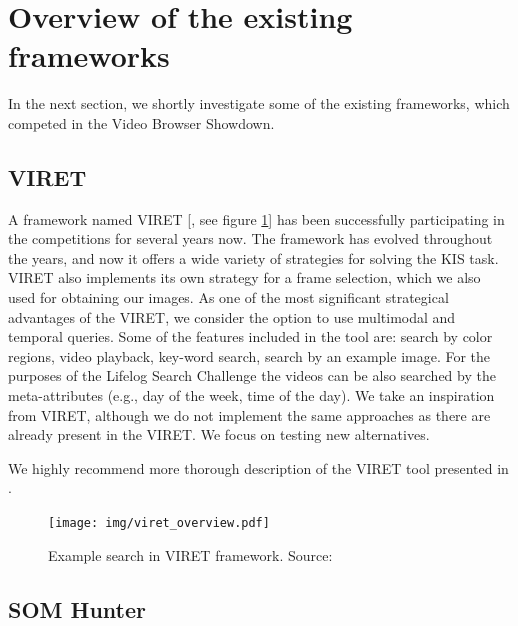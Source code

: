 \section{Overview of the existing frameworks}

In the next section, we shortly investigate some of the existing frameworks, which competed in the Video Browser Showdown. 

\subsection{VIRET}

A framework named VIRET [\cite{lokovc2019framework, lokovc2019viret}, see figure \ref{fig:viret}] has been successfully participating in the competitions for several years now. The framework has evolved throughout the years, and now it offers a wide variety of strategies for solving the KIS task. VIRET also implements its own strategy for a frame selection, which we also used for obtaining our images. As one of the most significant strategical advantages of the VIRET, we consider the option to use multimodal and temporal queries. Some of the features included in the tool are: search by color regions, video playback, key-word search, search by an example image. For the purposes of the Lifelog Search Challenge \citep{LSC20} the videos can be also searched by the meta-attributes (e.g., day of the week, time of the day). We take an inspiration from VIRET, although we do not implement the same approaches as there are already present in the VIRET. We focus on testing new alternatives.

We highly recommend more thorough description of the VIRET tool presented in \cite{kovalvcik2020viret}.

\begin{figure}
    \centering
    \texttt{[image: img/viret\_overview.pdf]}
    \caption{Example search in VIRET framework. Source: \cite{kovalvcik2020viret}}
    \label{fig:viret}
\end{figure}

\subsection{SOM Hunter}

